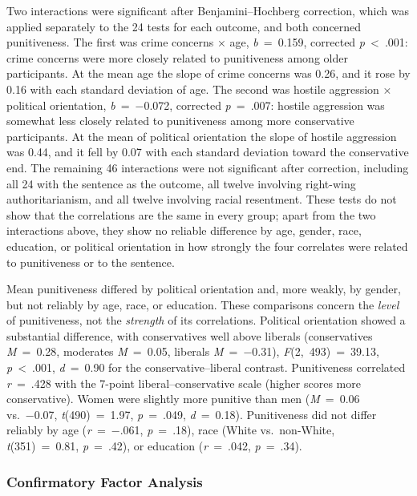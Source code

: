 Two interactions were significant after Benjamini--Hochberg correction, which was applied separately to the 24 tests for each outcome, and both concerned punitiveness. The first was crime concerns × age, \emph{b}~=~0.159, corrected \emph{p}~\textless{}~.001: crime concerns were more closely related to punitiveness among older participants. At the mean age the slope of crime concerns was 0.26, and it rose by 0.16 with each standard deviation of age. The second was hostile aggression × political orientation, \emph{b}~=~−0.072, corrected \emph{p}~=~.007: hostile aggression was somewhat less closely related to punitiveness among more conservative participants. At the mean of political orientation the slope of hostile aggression was 0.44, and it fell by 0.07 with each standard deviation toward the conservative end. The remaining 46 interactions were not significant after correction, including all 24 with the sentence as the outcome, all twelve involving right-wing authoritarianism, and all twelve involving racial resentment. These tests do not show that the correlations are the same in every group; apart from the two interactions above, they show no reliable difference by age, gender, race, education, or political orientation in how strongly the four correlates were related to punitiveness or to the sentence.

Mean punitiveness differed by political orientation and, more weakly, by gender, but not reliably by age, race, or education. These comparisons concern the \emph{level} of punitiveness, not the \emph{strength} of its correlations. Political orientation showed a substantial difference, with conservatives well above liberals (conservatives \emph{M}~=~0.28, moderates \emph{M}~=~0.05, liberals \emph{M}~=~−0.31), \emph{F}(2,~493)~=~39.13, \emph{p}~\textless{}~.001, \emph{d}~=~0.90 for the conservative--liberal contrast. Punitiveness correlated \emph{r}~=~.428 with the 7-point liberal--conservative scale (higher scores more conservative). Women were slightly more punitive than men (\emph{M}~=~0.06 vs.~−0.07, \emph{t}(490)~=~1.97, \emph{p}~=~.049, \emph{d}~=~0.18). Punitiveness did not differ reliably by age (\emph{r}~=~−.061, \emph{p}~=~.18), race (White vs.~non-White, \emph{t}(351)~=~0.81, \emph{p}~=~.42), or education (\emph{r}~=~.042, \emph{p}~=~.34).

\subsubsection{Confirmatory Factor Analysis}\label{confirmatory-factor-analysis}

